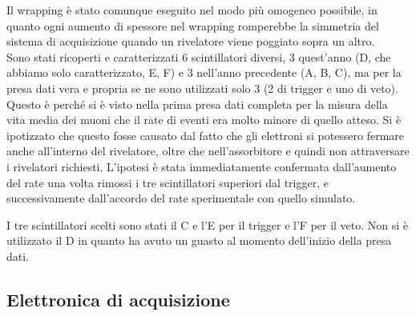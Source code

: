 Il wrapping è stato comunque eseguito nel modo più omogeneo possibile, in quanto ogni aumento di spessore nel wrapping romperebbe la simmetria del sistema di acquisizione quando un rivelatore viene poggiato sopra un altro.\\

Sono stati ricoperti e caratterizzati 6 scintillatori diversi, 3 quest'anno (D, che abbiamo solo caratterizzato, E, F) e 3 nell'anno precedente (A, B, C), ma per la presa dati vera e propria se ne sono utilizzati solo 3 (2 di trigger e uno di veto). Questo \`e perch\'e si \`e visto nella prima presa dati completa per la misura della vita media dei muoni che il rate di eventi era molto minore di quello atteso. Si \`e ipotizzato che questo fosse causato dal fatto che gli elettroni si potessero fermare anche all'interno del rivelatore, oltre che nell'assorbitore e quindi non attraversare i  rivelatori richiesti. L'ipotesi \`e stata immediatamente confermata dall'aumento del rate una volta rimossi i tre scintillatori superiori dal trigger, e successivamente dall'accordo del rate sperimentale con quello simulato.

I tre scintillatori scelti sono stati il C e l'E per il trigger e l'F per il veto. Non si \`e utilizzato il D in quanto ha avuto un guasto al momento dell'inizio della presa dati.

\subsection{Elettronica di acquisizione}

